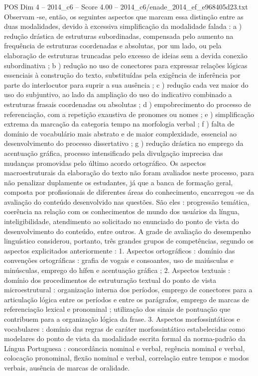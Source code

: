 \begin{textsample}{POS Dim 4 – 2014\_c6 – Score 4.00 – 2014\_c6/enade\_2014\_ef\_e968405d23.txt}
Observam -se, então, os seguintes aspectos que marcam essa distinção entre as duas modalidades, devido à excessiva simplificação da modalidade falada : a ) redução drástica de estruturas subordinadas, compensada pelo aumento na frequência de estruturas coordenadas e absolutas, por um lado, ou pela elaboração de estruturas truncadas pelo excesso de ideias sem a devida conexão subordinativa ; b ) redução no uso de conectores para expressar relações lógicas essenciais à construção do texto, substituídas pela exigência de inferência por parte do interlocutor para suprir a sua ausência ; c ) redução cada vez maior do uso do subjuntivo, ao lado da ampliação do uso do indicativo combinado a estruturas frasais coordenadas ou absolutas ; d ) empobrecimento do processo de referenciação, com a repetição exaustiva de pronomes ou nomes ; e ) simplificação extrema da marcação da categoria tempo na morfologia verbal ; f ) falta de domínio de vocabulário mais abstrato e de maior complexidade, essencial ao desenvolvimento do processo dissertativo ; g ) redução drástica no emprego da acentuação gráfica, processo intensificado pela divulgação imprecisa das mudanças promovidas pelo último acordo ortográfico.
Os aspectos macroestruturais da elaboração do texto não foram avaliados neste processo, para não penalizar duplamente os estudantes, já que a banca de formação geral, composta por profissionais de diferentes áreas do conhecimento, encarregou -se da avaliação do conteúdo desenvolvido nas questões.
São eles : progressão temática, coerência na relação com os conhecimentos de mundo dos usuários da língua, inteligibilidade, atendimento ao solicitado no enunciado do ponto de vista do desenvolvimento do conteúdo, entre outros.
A grade de avaliação do desempenho linguístico considerou, portanto, três grandes grupos de competências, segundo os aspectos explicitados anteriormente : 1.
Aspectos ortográficos : domínio das convenções ortográficas : grafia de vogais e consoantes, uso de maiúsculas e minúsculas, emprego do hífen e acentuação gráfica ; 2.
Aspectos textuais : domínio dos procedimentos de estruturação textual do ponto de vista microestrutural : organização interna dos períodos, emprego de conectores para a articulação lógica entre os períodos e entre os parágrafos, emprego de marcas de referenciação lexical e pronominal ; utilização dos sinais de pontuação que contribuem para a organização lógica da frase. 3.
Aspectos morfossintáticos e vocabulares : domínio das regras de caráter morfossintático estabelecidas como modelares do ponto de vista da modalidade escrita formal da norma-padrão da Língua Portuguesa : concordância nominal e verbal, regência nominal e verbal, colocação pronominal, flexão nominal e verbal, correlação entre tempos e modos verbais, ausência de marcas de oralidade.

\end{textsample}
